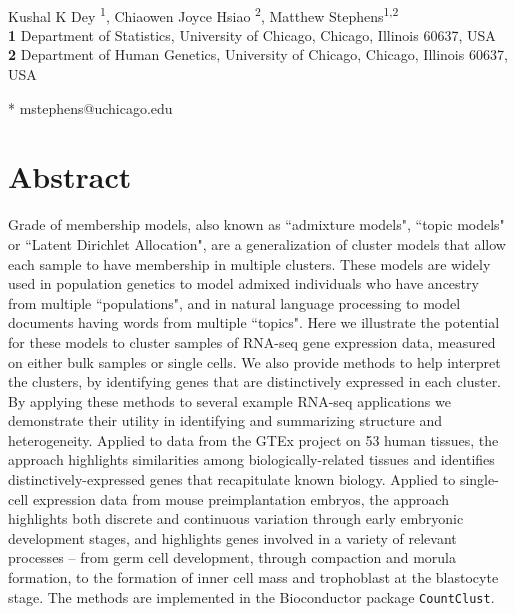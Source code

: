\documentclass[10pt,letterpaper]{article}
\begin{document}
\vspace*{0.2in}

\begin{flushleft}
{\Large
\textbf{}
}
\newline
\\
Kushal K Dey \textsuperscript{1},
Chiaowen Joyce Hsiao \textsuperscript{2},
Matthew Stephens\textsuperscript{1,2}
\\
\bigskip
\textbf{1} Department of Statistics, University of Chicago, Chicago, Illinois 60637, USA
\\
\textbf{2} Department of Human Genetics, University of Chicago, Chicago, Illinois 60637, USA
\\
\bigskip

* mstephens@uchicago.edu

\end{flushleft}


\section*{Abstract}
Grade of membership models, also known as ``admixture models", ``topic models" or ``Latent Dirichlet Allocation",
are a generalization of cluster models that allow each sample to have membership in multiple clusters.
These models are widely used in population genetics to model admixed individuals who have ancestry from multiple ``populations",
and in natural language processing to model documents having words from multiple ``topics". Here we illustrate the potential for these models
to cluster samples of RNA-seq gene expression data, measured on either bulk samples or single cells.
We also provide methods to help interpret the clusters, by identifying genes that are distinctively expressed in each cluster.
By applying these methods to several example RNA-seq applications we demonstrate their utility in
identifying and summarizing structure and heterogeneity. Applied to
data from the GTEx project on 53 human tissues, the approach highlights similarities among biologically-related tissues and
identifies distinctively-expressed genes that recapitulate known biology.  Applied to single-cell expression data from
mouse preimplantation embryos, the approach highlights both discrete and continuous variation through early embryonic development stages,
and highlights genes involved in a variety of relevant processes -- from germ cell development, through compaction and morula formation, to
the formation of inner cell mass and trophoblast at the blastocyte stage.
The methods are implemented in the Bioconductor package {\tt CountClust}.
\end{document}
